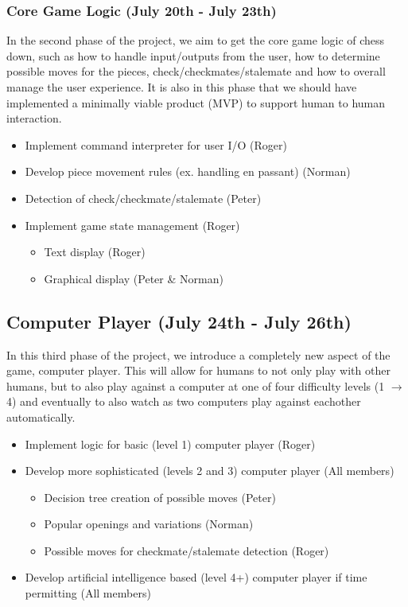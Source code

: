 \documentclass{article}
\begin{document}
\subsubsection*{Core Game Logic (July 20th - July 23th)}
In the second phase of the project, we aim to get the core game logic of chess down, such as how to handle input/outputs from the user, 
how to determine possible moves for the pieces, check/checkmates/stalemate and how to overall manage the user experience. It is also in this phase 
that we should have implemented a minimally viable product (MVP) to support human to human interaction.
\begin{itemize}
    \item Implement command interpreter for user I/O (Roger)
    \item Develop piece movement rules (ex. handling en passant) (Norman)
    \item Detection of check/checkmate/stalemate (Peter)
    \item Implement game state management (Roger)
    \begin{itemize}
        \item Text display (Roger)
        \item Graphical display (Peter \& Norman)
    \end{itemize}
\end{itemize}
\subsection*{Computer Player (July 24th - July 26th)}
In this third phase of the project, we introduce a completely new aspect of the game, computer player. This will allow for humans to not only play
with other humans, but to also play against a computer at one of four difficulty levels (1 $\to$ 4) and eventually to also watch as two computers 
play against eachother automatically.
\begin{itemize}
    \item Implement logic for basic (level 1) computer player (Roger)
    \item Develop more sophisticated (levels 2 and 3) computer player  (All members)
    \begin{itemize}
        \item Decision tree creation of possible moves (Peter)
        \item Popular openings and variations (Norman)
        \item Possible moves for checkmate/stalemate detection (Roger)
    \end{itemize}
    \item Develop artificial intelligence based (level 4+) computer player if time permitting (All members)
\end{itemize}
\end{document}
